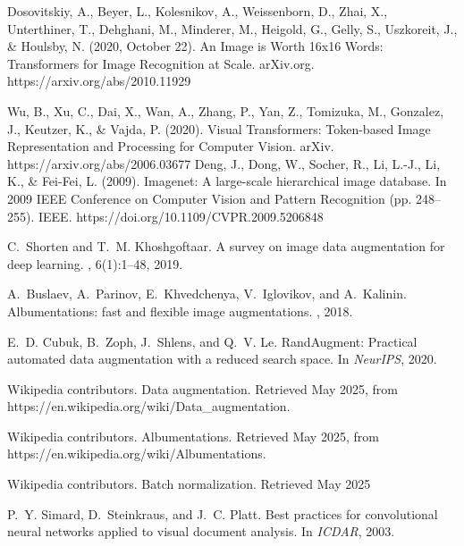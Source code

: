 \begin{thebibliography}{}




Dosovitskiy, A., Beyer, L., Kolesnikov, A., Weissenborn, D., Zhai, X., Unterthiner, T., Dehghani, M., Minderer, M., Heigold, G., Gelly, S., Uszkoreit, J., \& Houlsby, N. (2020, October 22). An Image is Worth 16x16 Words: Transformers for Image Recognition at Scale. arXiv.org. https://arxiv.org/abs/2010.11929

Wu, B., Xu, C., Dai, X., Wan, A., Zhang, P., Yan, Z., Tomizuka, M., Gonzalez, J., Keutzer, K., \& Vajda, P. (2020). Visual Transformers: Token-based Image Representation and Processing for Computer Vision. arXiv. https://arxiv.org/abs/2006.03677
Deng, J., Dong, W., Socher, R., Li, L.-J., Li, K., \& Fei-Fei, L. (2009). Imagenet: A large-scale hierarchical image database. In 2009 IEEE Conference on Computer Vision and Pattern Recognition (pp. 248–255). IEEE. https://doi.org/10.1109/CVPR.2009.5206848

C.~Shorten and T.~M. Khoshgoftaar.
\newblock A survey on image data augmentation for deep learning.
, 6(1):1--48, 2019.

A.~Buslaev, A.~Parinov, E.~Khvedchenya, V.~Iglovikov, and A.~Kalinin.
\newblock Albumentations: fast and flexible image augmentations.
, 2018.

E.~D. Cubuk, B.~Zoph, J.~Shlens, and Q.~V. Le.
\newblock RandAugment: Practical automated data augmentation with a reduced
  search space.
\newblock In {\em NeurIPS}, 2020.

Wikipedia contributors.
\newblock Data augmentation.
\newblock Retrieved May 2025, from https://en.wikipedia.org/wiki/Data\_augmentation.

Wikipedia contributors.
\newblock Albumentations.
\newblock Retrieved May 2025, from https://en.wikipedia.org/wiki/Albumentations.

Wikipedia contributors.
\newblock Batch normalization.
\newblock Retrieved May 2025

P.~Y. Simard, D.~Steinkraus, and J.~C. Platt.
\newblock Best practices for convolutional neural networks applied to visual
  document analysis.
\newblock In {\em ICDAR}, 2003.

\end{thebibliography}
